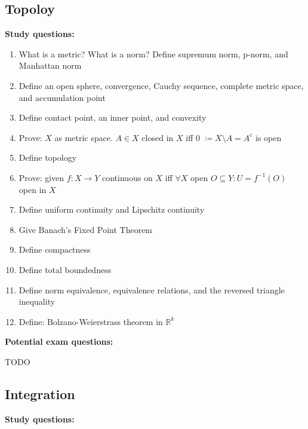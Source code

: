 \documentclass{article}
\begin{document}
\subsection{Topoloy}

\textbf{Study questions:}

\begin{enumerate}
  \item What is a metric? What is a norm? Define supremum norm, p-norm, and Manhattan norm
  \item Define an open sphere, convergence, Cauchy sequence, complete metric space, and accumulation point
  \item Define contact point, an inner point, and convexity
  \item Prove: $X$ as metric space. $A \in X$ closed in $X$ iff 0 $\coloneqq X \setminus A = A^c$ is open
  \item Define topology
  \item Prove: given $f: X \to Y$ continuous on $X$ iff $\forall X$ open $O \subseteq Y: U = f^{-1}(O)$ open in $X$
  \item Define uniform continuity and Lipschitz continuity
  \item Give Banach's Fixed Point Theorem
  \item Define compactness
  \item Define total boundedness
  \item Define norm equivalence, equivalence relations, and the reversed triangle inequality
  \item Define: Bolzano-Weierstrass theorem in $\mathbb R^k$
\end{enumerate}

\textbf{Potential exam questions:}

TODO

\subsection{Integration}

\textbf{Study questions:}
\end{document}
